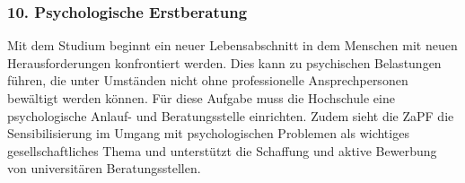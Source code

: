 \documentclass[DIV=calc]{scrartcl}
\begin{document}
\hypertarget{psychologische-erstberatung}{%
\subsubsection*{10. Psychologische Erstberatung}\label{psychologische-erstberatung}}

Mit dem Studium beginnt ein neuer Lebensabschnitt in dem Menschen mit neuen Herausforderungen konfrontiert werden. Dies kann zu psychischen Belastungen führen, die unter Umständen nicht ohne professionelle Ansprechpersonen bewältigt werden können. Für diese Aufgabe muss die Hochschule eine psychologische Anlauf- und Beratungsstelle einrichten. Zudem sieht die ZaPF die Sensibilisierung im Umgang mit psychologischen Problemen als wichtiges gesellschaftliches Thema und unterstützt die Schaffung und aktive Bewerbung von universitären Beratungsstellen.
\end{document}
